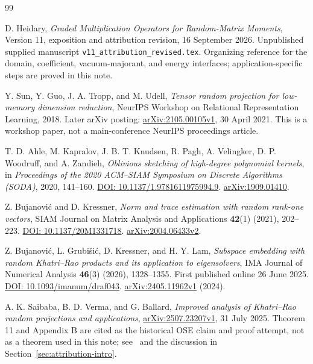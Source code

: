 \documentclass[11pt]{article}
\numberwithin{equation}{section}
\theoremstyle{definition}\newtheorem{definition}[theorem]{Definition}
\theoremstyle{remark}\newtheorem{remark}[theorem]{Remark}
\begin{document}
\begin{thebibliography}{99}
\raggedright
{}
D. Heidary, \emph{Graded Multiplication Operators for Random-Matrix Moments},
Version 11, exposition and attribution revision, 16 September 2026.
Unpublished supplied manuscript \texttt{v11\_attribution\_revised.tex}.
Organizing reference for the domain, coefficient, vacuum-majorant, and energy
interfaces; application-specific steps are proved in this note.

Y. Sun, Y. Guo, J. A. Tropp, and M. Udell,
\emph{Tensor random projection for low-memory dimension reduction},
NeurIPS Workshop on Relational Representation Learning, 2018.
Later arXiv posting: \href{https://arxiv.org/abs/2105.00105v1}{arXiv:2105.00105v1},
30 April 2021. This is a workshop paper, not a main-conference NeurIPS proceedings article.

T. D. Ahle, M. Kapralov, J. B. T. Knudsen, R. Pagh, A. Velingker,
D. P. Woodruff, and A. Zandieh,
\emph{Oblivious sketching of high-degree polynomial kernels},
in \emph{Proceedings of the 2020 ACM--SIAM Symposium on Discrete Algorithms
(SODA)}, 2020, 141--160.
\href{https://doi.org/10.1137/1.9781611975994.9}{DOI: 10.1137/1.9781611975994.9}.
\href{https://arxiv.org/abs/1909.01410}{arXiv:1909.01410}.

Z. Bujanovi\'c and D. Kressner,
\emph{Norm and trace estimation with random rank-one vectors},
SIAM Journal on Matrix Analysis and Applications \textbf{42}(1) (2021), 202--223.
\href{https://doi.org/10.1137/20M1331718}{DOI: 10.1137/20M1331718}.
\href{https://arxiv.org/abs/2004.06433v2}{arXiv:2004.06433v2}.

Z. Bujanovi\'c, L. Grubi\v{s}i\'c, D. Kressner, and H. Y. Lam,
\emph{Subspace embedding with random Khatri--Rao products and its application to
eigensolvers}, IMA Journal of Numerical Analysis \textbf{46}(3) (2026), 1328--1355.
First published online 26 June 2025.
\href{https://doi.org/10.1093/imanum/draf043}{DOI: 10.1093/imanum/draf043}.
\href{https://arxiv.org/abs/2405.11962v1}{arXiv:2405.11962v1} (2024).

A. K. Saibaba, B. D. Verma, and G. Ballard,
\emph{Improved analysis of Khatri--Rao random projections and applications},
\href{https://arxiv.org/abs/2507.23207v1}{arXiv:2507.23207v1}, 31 July 2025.
Theorem 11 and Appendix B are cited as the historical OSE claim and proof attempt,
not as a theorem used in this note; see~\cite{SVBv2,BM} and the discussion in
Section~\ref{sec:attribution-intro}.


\end{thebibliography}
\end{document}
